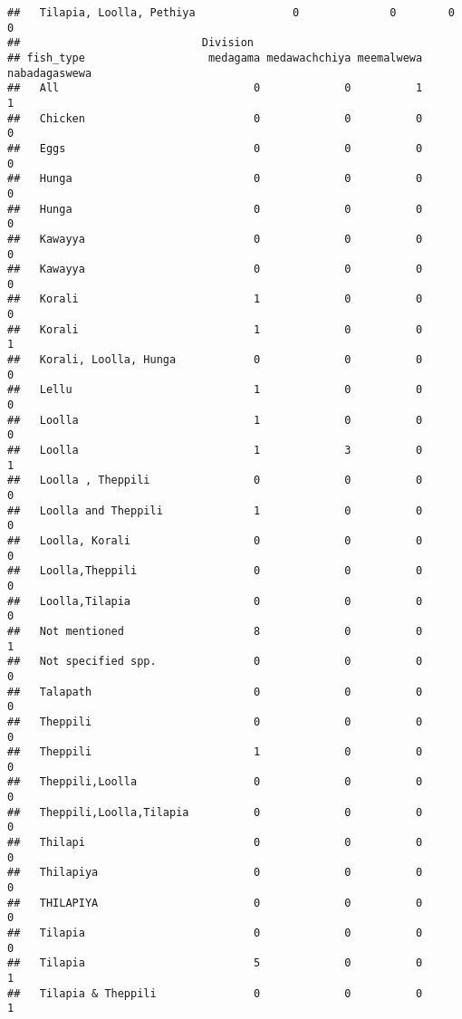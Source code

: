 \documentclass[
]{article}
\begin{document}
\begin{verbatim}
##   Tilapia, Loolla, Pethiya               0              0        0           0
##                            Division
## fish_type                   medagama medawachchiya meemalwewa nabadagaswewa
##   All                              0             0          1             1
##   Chicken                          0             0          0             0
##   Eggs                             0             0          0             0
##   Hunga                            0             0          0             0
##   Hunga                            0             0          0             0
##   Kawayya                          0             0          0             0
##   Kawayya                          0             0          0             0
##   Korali                           1             0          0             0
##   Korali                           1             0          0             1
##   Korali, Loolla, Hunga            0             0          0             0
##   Lellu                            1             0          0             0
##   Loolla                           1             0          0             0
##   Loolla                           1             3          0             1
##   Loolla , Theppili                0             0          0             0
##   Loolla and Theppili              1             0          0             0
##   Loolla, Korali                   0             0          0             0
##   Loolla,Theppili                  0             0          0             0
##   Loolla,Tilapia                   0             0          0             0
##   Not mentioned                    8             0          0             1
##   Not specified spp.               0             0          0             0
##   Talapath                         0             0          0             0
##   Theppili                         0             0          0             0
##   Theppili                         1             0          0             0
##   Theppili,Loolla                  0             0          0             0
##   Theppili,Loolla,Tilapia          0             0          0             0
##   Thilapi                          0             0          0             0
##   Thilapiya                        0             0          0             0
##   THILAPIYA                        0             0          0             0
##   Tilapia                          0             0          0             0
##   Tilapia                          5             0          0             1
##   Tilapia & Theppili               0             0          0             1

\end{verbatim}
\end{document}
